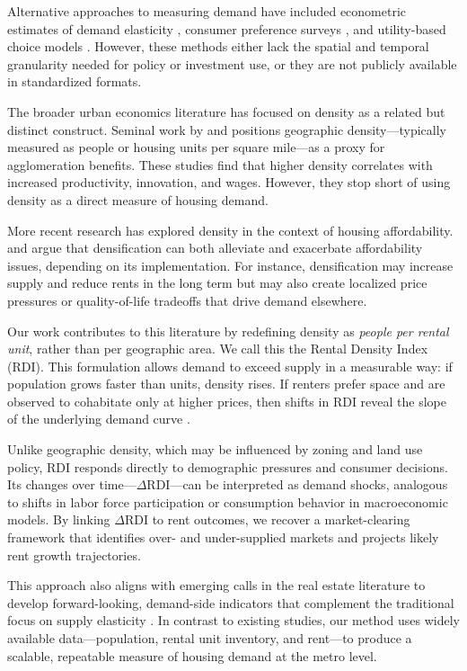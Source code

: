 \documentclass[APA,Times1COL]{WileyNJDv5} %
\begin{document}
Alternative approaches to measuring demand have included econometric estimates of demand elasticity \cite{green2002measuring}, consumer preference surveys \cite{malpezzi1996rent}, and utility-based choice models \cite{rosenthal1997housing}. However, these methods either lack the spatial and temporal granularity needed for policy or investment use, or they are not publicly available in standardized formats.

The broader urban economics literature has focused on density as a related but distinct construct. Seminal work by \cite{glaeser2001cities} and \cite{duranton2004micro} positions geographic density---typically measured as people or housing units per square mile---as a proxy for agglomeration benefits. These studies find that higher density correlates with increased productivity, innovation, and wages. However, they stop short of using density as a direct measure of housing demand.

More recent research has explored density in the context of housing affordability. \cite{ahlfeldt2019economic} and \cite{albouy2015driving} argue that densification can both alleviate and exacerbate affordability issues, depending on its implementation. For instance, densification may increase supply and reduce rents in the long term but may also create localized price pressures or quality-of-life tradeoffs that drive demand elsewhere.

Our work contributes to this literature by redefining density as \textit{people per rental unit}, rather than per geographic area. We call this the Rental Density Index (RDI). This formulation allows demand to exceed supply in a measurable way: if population grows faster than units, density rises. If renters prefer space and are observed to cohabitate only at higher prices, then shifts in RDI reveal the slope of the underlying demand curve \cite{muth1969cities, molloy2022housing}.

Unlike geographic density, which may be influenced by zoning and land use policy, RDI responds directly to demographic pressures and consumer decisions. Its changes over time---\( \Delta \text{RDI} \)---can be interpreted as demand shocks, analogous to shifts in labor force participation or consumption behavior in macroeconomic models. By linking \( \Delta \text{RDI} \) to rent outcomes, we recover a market-clearing framework that identifies over- and under-supplied markets and projects likely rent growth trajectories.

This approach also aligns with emerging calls in the real estate literature to develop forward-looking, demand-side indicators that complement the traditional focus on supply elasticity \cite{glaeser2019rethinking}. In contrast to existing studies, our method uses widely available data---population, rental unit inventory, and rent---to produce a scalable, repeatable measure of housing demand at the metro level.
\end{document}
